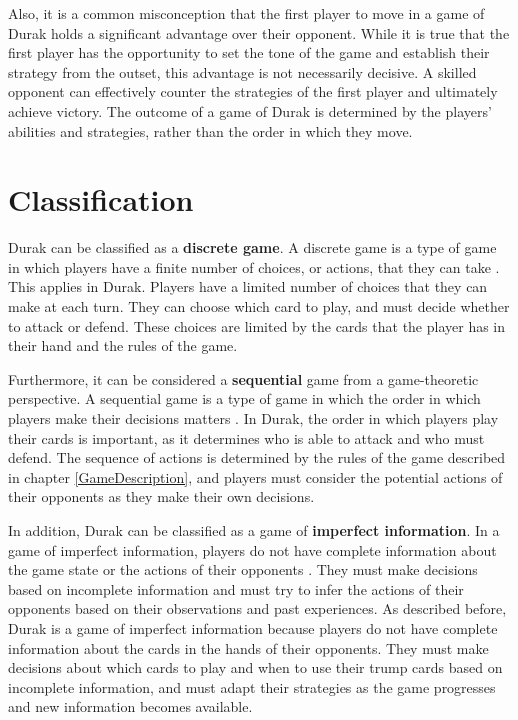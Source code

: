 Also, it is a common misconception that the first player to move in a game of Durak holds a significant advantage over their opponent. While it is true that the first player has the opportunity to set the tone of the game and establish their strategy from the outset, this advantage is not necessarily decisive. A skilled opponent can effectively counter the strategies of the first player and ultimately achieve victory. The outcome of a game of Durak is determined by the players' abilities and strategies, rather than the order in which they move.

\section{Classification}

Durak can be classified as a \textbf{discrete game}. A discrete game is a type of game in which players have a finite number of choices, or actions, that they can take \citep{Gametheory4}. This applies in Durak. Players have a limited number of choices that they can make at each turn. They can choose which card to play, and must decide whether to attack or defend. These choices are limited by the cards that the player has in their hand and the rules of the game. 

Furthermore, it can be considered a \textbf{sequential} game from a game-theoretic perspective. A sequential game is a type of game in which the order in which players make their decisions matters \citep{Gametheory4}. In Durak, the order in which players play their cards is important, as it determines who is able to attack and who must defend. The sequence of actions is determined by the rules of the game described in chapter \ref{GameDescription}, and players must consider the potential actions of their opponents as they make their own decisions. 

In addition, Durak can be classified as a game of \textbf{imperfect information}. In a game of imperfect information, players do not have complete information about the game state or the actions of their opponents \citep{Gametheory4}. They must make decisions based on incomplete information and must try to infer the actions of their opponents based on their observations and past experiences. As described before, Durak is a game of imperfect information because players do not have complete information about the cards in the hands of their opponents. They must make decisions about which cards to play and when to use their trump cards based on incomplete information, and must adapt their strategies as the game progresses and new information becomes available.

